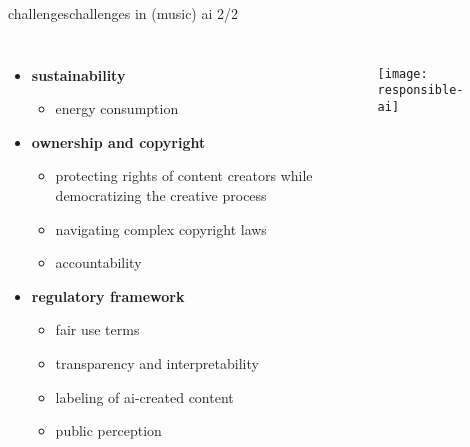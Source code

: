 \begin{frame}{challenges}{challenges in (music) ai 2/2}
    \vspace{-5mm}
    \begin{columns}
        \begin{itemize}
            \item   \textbf{sustainability}
                \begin{itemize}
                    \item energy consumption
                \end{itemize}
            \smallskip
            \item   \textbf{ownership and copyright}
                \begin{itemize}
                    \item protecting rights of content creators while democratizing the creative process
                    \item navigating complex copyright laws
                    \item accountability
                \end{itemize}
            \smallskip
            \item   \textbf{regulatory framework}
                \begin{itemize}
                    \item fair use terms
                    \item transparency and interpretability
                    \item labeling of ai-created content
                    \item public perception
                \end{itemize}
        \end{itemize}
        \vspace{20mm}
        \begin{figure}%
            \texttt{[image: responsible-ai]}%
        \end{figure}
    \end{columns}
\end{frame}
